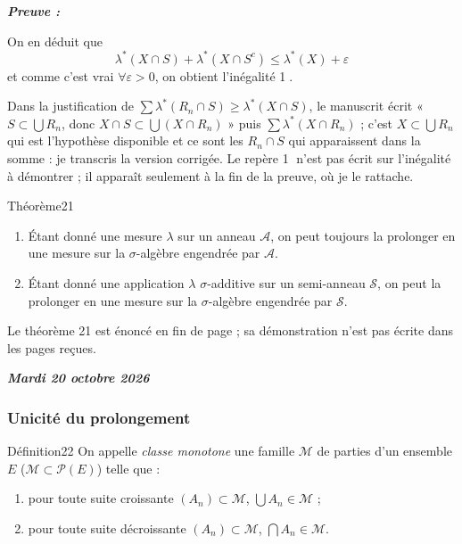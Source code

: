\documentclass[11pt,a4paper]{article}
\newcommand{\A}{\mathscr{A}}
\newcommand{\M}{\mathscr{M}}
\newcommand{\Pp}{\mathscr{P}}
\newcommand{\Ss}{\mathscr{S}}
\newenvironment{preuve}{\par\textit{\textbf{Preuve :}}\par\nopagebreak[4]}{\par}
\newcommand{\datepage}[1]{\begin{flushright}\small\bfseries\itshape\color{bleuclair}#1\end{flushright}\vspace{-8pt}}
\begin{document}
\begin{preuve}
On en déduit que
\[
  \lambda^*(X\cap S)+\lambda^*(X\cap S^c)\le\lambda^*(X)+\varepsilon
\]
et comme c'est vrai $\forall\varepsilon>0$, on obtient l'inégalité \textcircled{\scriptsize 1}.

\begin{note}
Dans la justification de $\sum\lambda^*(R_n\cap S)\ge\lambda^*(X\cap S)$, le manuscrit écrit « $S\subset\bigcup R_n$, donc $X\cap S\subset\bigcup(X\cap R_n)$ » puis $\sum\lambda^*(X\cap R_n)$ ;
c'est $X\subset\bigcup R_n$ qui est l'hypothèse disponible et ce sont les $R_n\cap S$ qui apparaissent dans la somme : je transcris la version corrigée.
Le repère \textcircled{\scriptsize 1} n'est pas écrit sur l'inégalité à démontrer ; il apparaît seulement à la fin de la preuve, où je le rattache.
\end{note}
\end{preuve}

\begin{enonce}{Théorème}{21}
\begin{enumerate}[label=\textbf{\arabic*-},leftmargin=1.2cm]
  \item Étant donné une mesure $\lambda$ sur un anneau $\A$, on peut toujours la prolonger en une mesure sur la $\sigma$-algèbre engendrée par $\A$.
  \item Étant donné une application $\lambda$ $\sigma$-additive sur un semi-anneau $\Ss$, on peut la prolonger en une mesure sur la $\sigma$-algèbre engendrée par $\Ss$.
\end{enumerate}
\end{enonce}

\begin{note}
Le théorème 21 est énoncé en fin de page ; sa démonstration n'est pas écrite dans les pages reçues.
\end{note}


\newpage
\datepage{Mardi 20 octobre 2026}
\subsubsection*{Unicité du prolongement}

\begin{enonce}{Définition}{22}
On appelle \emph{classe monotone} une famille $\M$ de parties d'un ensemble $E$ ($\M\subset\Pp(E)$) telle que :
\begin{enumerate}[label=\textbf{\arabic*)},leftmargin=1.2cm]
  \item pour toute suite croissante $(A_n)\subset\M$, $\displaystyle\bigcup A_n\in\M$ ;
  \item pour toute suite décroissante $(A_n)\subset\M$, $\displaystyle\bigcap A_n\in\M$.
\end{enumerate}
\end{enonce}
\end{document}
